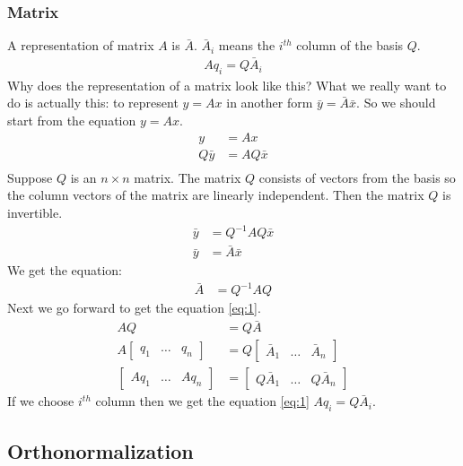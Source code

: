 \documentclass{article}
\begin{document}
\subsubsection{Matrix}
A representation of matrix \(A\) is \(\bar{A}\). \(\bar{A}_i\) means the \(i^{th}\) column of the basis \(Q\).
\begin{align} \label{eq:1}
Aq_i=Q\bar{A}_i
\end{align}
Why does the representation of a matrix look like this? What we really want to do is actually this: to represent \(y=Ax\) in another form \(\bar{y}=\bar{A}\bar{x}\). So we should start from the equation \(y=Ax\).
\begin{align*}
y&=Ax \\
Q\bar{y}&=AQ\bar{x} \\
\end{align*}
Suppose \(Q\) is an \(n \times n\) matrix. The matrix \(Q\) consists of vectors from the basis so the column vectors of the matrix are linearly independent. Then the matrix \(Q\) is invertible.
\begin{align*}
\bar{y}&=Q^{-1}AQ\bar{x} \\
\bar{y}&=\bar{A}\bar{x}
\end{align*}
We get the equation:
\begin{align} \label{eq:similarity_transform}
\bar{A} &= Q^{-1}AQ
\end{align}
Next we go forward to get the equation \ref{eq:1}.
\begin{align*}
AQ&=Q\bar{A}\\
A\left[\begin{matrix} q_1 & \dots & q_n\end{matrix} \right]
&= Q\left[\begin{matrix} \bar{A}_1 & \dots & \bar{A}_n\end{matrix} \right] \\
\left[\begin{matrix} Aq_1 & \dots & Aq_n\end{matrix} \right]
&= \left[\begin{matrix} Q\bar{A}_1 & \dots & Q\bar{A}_n\end{matrix} \right]
\end{align*}
If we choose \(i^{th}\) column then we get the equation \ref{eq:1} \(Aq_i=Q\bar{A}_i\).
\citep{Chen_2014}

\subsection{Orthonormalization}
\end{document}
